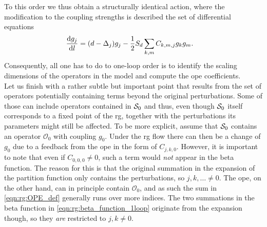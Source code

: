To this order we thus obtain a structurally identical action, where the modification to the coupling strengths is described the set of differential equations
\begin{align}
\frac{\text{d} g_j}{\text{d} l} &= (d - \Delta_j) g_j - \frac{1}{2} S_d \sum_{k,m} C_{k,m,j} g_kg_m. \label{eqn:rg:beta_function_1loop}
\end{align}
Consequently, all one has to do to one-loop order is to identify the scaling dimensions of the operators in the model and compute the \gls{ope} coefficients.\\
Let us finish with a rather subtle but important point that results from the set of operators potentially containing terms beyond the original perturbations.
Some of those can include operators contained in $\mathcal{S}_0$ and thus, even though $\mathcal{S}_0$ itself corresponds to a fixed point of the \gls{rg}, together with the perturbations its parameters might still be affected.
To be more explicit, assume that $\mathcal{S}_0$ contains an operator $\mathcal{O}_0$ with coupling $g_0$.
Under the \gls{rg} flow there can then be a change of $g_0$ due to a feedback from the \gls{ope} in the form of $C_{j,k,0}$.
However, it is important to note that even if $C_{0,0,0} \neq 0$, such a term would \emph{not} appear in the beta function.
The reason for this is that the original summation in the expansion of the partition function only contains the perturbations, so $j,k,\dots \neq 0$.
The \gls{ope}, on the other hand, can in principle contain $\mathcal{O}_0$, and as such the sum in \autoref{eqn:rg:OPE_def} generally runs over more indices.
The two summations in the beta function in \autoref{eqn:rg:beta_function_1loop} originate from the expansion though, so they \emph{are} restricted to $j,k\neq 0$.